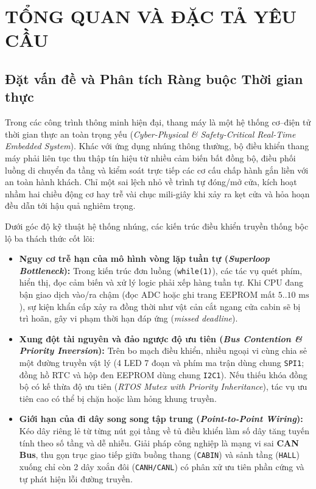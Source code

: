 \section{TỔNG QUAN VÀ ĐẶC TẢ YÊU CẦU}

\subsection{Đặt vấn đề và Phân tích Ràng buộc Thời gian thực}
Trong các công trình thông minh hiện đại, thang máy là một hệ thống cơ--điện tử thời gian thực an toàn trọng yếu (\textit{Cyber-Physical \& Safety-Critical Real-Time Embedded System}). Khác với ứng dụng nhúng thông thường, bộ điều khiển thang máy phải liên tục thu thập tín hiệu từ nhiều cảm biến bất đồng bộ, điều phối luồng di chuyển đa tầng và kiểm soát trực tiếp các cơ cấu chấp hành gắn liền với an toàn hành khách. Chỉ một sai lệch nhỏ về trình tự đóng/mở cửa, kích hoạt nhầm hai chiều động cơ hay trễ vài chục mili-giây khi xảy ra kẹt cửa và hỏa hoạn đều dẫn tới hậu quả nghiêm trọng.

Dưới góc độ kỹ thuật hệ thống nhúng, các kiến trúc điều khiển truyền thống bộc lộ ba thách thức cốt lõi:
\begin{itemize}[nosep]
    \item \textbf{Nguy cơ trễ hạn của mô hình vòng lặp tuần tự (\textit{Superloop Bottleneck}):} Trong kiến trúc đơn luồng (\texttt{while(1)}), các tác vụ quét phím, hiển thị, đọc cảm biến và xử lý logic phải xếp hàng tuần tự. Khi CPU đang bận giao dịch vào/ra chậm (đọc ADC hoặc ghi trang EEPROM mất $5..10\text{ ms}$), sự kiện khẩn cấp xảy ra đồng thời như vật cản cắt ngang cửa cabin sẽ bị trì hoãn, gây vi phạm thời hạn đáp ứng (\textit{missed deadline}).
    \item \textbf{Xung đột tài nguyên và đảo ngược độ ưu tiên (\textit{Bus Contention \& Priority Inversion}):} Trên bo mạch điều khiển, nhiều ngoại vi cùng chia sẻ một đường truyền vật lý (4 LED 7 đoạn và phím ma trận dùng chung \texttt{SPI1}; đồng hồ RTC và hộp đen EEPROM dùng chung \texttt{I2C1}). Nếu thiếu khóa đồng bộ có kế thừa độ ưu tiên (\textit{RTOS Mutex with Priority Inheritance}), tác vụ ưu tiên cao có thể bị chặn hoặc làm hỏng khung truyền.
    \item \textbf{Giới hạn của đi dây song song tập trung (\textit{Point-to-Point Wiring}):} Kéo dây riêng lẻ từ từng nút gọi tầng về tủ điều khiển làm số dây tăng tuyến tính theo số tầng và dễ nhiễu. Giải pháp công nghiệp là mạng vi sai \textbf{CAN Bus}, thu gọn trục giao tiếp giữa buồng thang (\texttt{CABIN}) và sảnh tầng (\texttt{HALL}) xuống chỉ còn 2 dây xoắn đôi (\texttt{CANH/CANL}) có phân xử ưu tiên phần cứng và tự phát hiện lỗi đường truyền.
\end{itemize}

